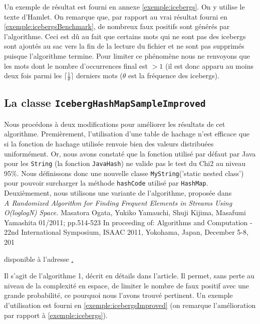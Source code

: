 \documentclass[12pt,a4paper,titlepage]{article}
\newcommand{\class}[1]{\texttt{#1}}
\begin{document}
Un exemple de résultat est fourni en annexe \ref{exemple:icebergs}. On y utilise le texte d'Hamlet. On remarque que, par rapport au vrai résultat fourni en \ref{exemple:icebergsBenchmark}, de nombreux faux positifs sont générés par l'algorithme. Ceci est dû au fait que certains mots qui ne sont pas des icebergs sont ajoutés au sac vers la fin de la lecture du fichier et ne sont pas supprimés puisque l'algorithme termine. Pour limiter ce phénomène nous ne renvoyons que les mots dont le nombre d'occurrences final est $>1$ (il est donc apparu au moins deux fois parmi les $\lceil\frac{1}{\theta}\rceil$ derniers mots ($\theta$ est la fréquence des icebergs).

\subsection{La classe \class{IcebergHashMapSampleImproved}}

Nous procédons à deux modifications pour améliorer les résultats de cet algorithme. Premièrement, l'utilisation d'une table de hachage n'est efficace que si la fonction de hachage utilisée renvoie bien des valeurs distribuées uniformément. Or, nous avons constaté que la fonction utilisé par défaut par Java pour les \class{String} (la fonction \class{JavaHash}) ne valide pas le test du Chi2 au niveau 95\%. Nous définissons donc une nouvelle classe \class{MyString}('static nested class') pour pouvoir surcharger la méthode \class{hashCode} utilisé par \class{HashMap}.\\

Deuxièmement, nous utilisons une variante de l'algorithme, proposée dans\\

\textit{A Randomized Algorithm for Finding Frequent Elements in Streams Using O(loglogN) Space.}
Masatora Ogata, Yukiko Yamauchi, Shuji Kijima, Masafumi Yamashita
01/2011; pp.514-523 In proceeding of: Algorithms and Computation - 22nd International Symposium, ISAAC 2011, Yokohama, Japan, December 5-8, 201

\noindent disponible à l'adresse
\href{http://www.google.fr/search?tbo=p&tbm=bks&q=isbn:3642255906}.


\noindent Il s'agit de l'algorithme 1, décrit en détails dans l'article. Il permet, sans perte au niveau de la complexité en espace, de limiter le nombre de faux positif avec une grande probabilité, ce pourquoi nous l'avons trouvé pertinent. Un exemple d'utilisation est fourni en \ref{exemple:icebergsImproved} (on remarque l'amélioration par rapport à \ref{exemple:icebergs}).
\end{document}
